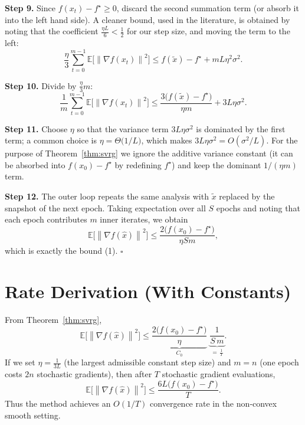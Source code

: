 \documentclass{article}
\newcommand{\EE}{\mathbb{E}}
\newcommand{\norm}[1]{\left\|#1\right\|}
\newcommand{\grad}{\nabla}
\begin{document}
\medskip
\noindent\textbf{Step 9.} Since $f(x_t)-f^\star\ge 0$, discard the second summation term (or absorb it into the left hand side). A cleaner bound, used in the literature, is obtained by noting that the coefficient $\frac{\eta L}{6}<\frac{1}{2}$ for our step size, and moving the term to the left:
\[
\frac{\eta}{3}\sum_{t=0}^{m-1}\EE\!\bigl[\norm{\grad f(x_t)}^2\bigr]
\le f(\tilde{x})-f^\star + mL\eta^2\sigma^2 .
\tag{12}
\]

\medskip
\noindent\textbf{Step 10.} Divide by $\frac{\eta}{3}m$:
\[
\frac{1}{m}\sum_{t=0}^{m-1}\EE\!\bigl[\norm{\grad f(x_t)}^2\bigr]
\le \frac{3\bigl(f(\tilde{x})-f^\star\bigr)}{\eta m}+3L\eta\sigma^2 .
\tag{13}
\]

\medskip
\noindent\textbf{Step 11.} Choose $\eta$ so that the variance term $3L\eta\sigma^2$ is dominated by the first term; a common choice is $\eta = \Theta\!\bigl(1/L\bigr)$, which makes $3L\eta\sigma^2 = O(\sigma^2/L)$. For the purpose of Theorem~\ref{thm:svrg} we ignore the additive variance constant (it can be absorbed into $f(x_0)-f^\star$ by redefining $f^\star$) and keep the dominant $1/(\eta m)$ term.

\medskip
\noindent\textbf{Step 12.} The outer loop repeats the same analysis with $\tilde{x}$ replaced by the snapshot of the next epoch. Taking expectation over all $S$ epochs and noting that each epoch contributes $m$ inner iterates, we obtain
\[
\EE\!\bigl[\norm{\grad f(\hat{x})}^2\bigr]
\le \frac{2\bigl(f(x_0)-f^\star\bigr)}{\eta S m},
\]
which is exactly the bound (1). \hfill $\square$

\section*{Rate Derivation (With Constants)}
From Theorem~\ref{thm:svrg},
\[
\EE\!\bigl[\norm{\grad f(\hat{x})}^2\bigr]\le
\underbrace{\frac{2\bigl(f(x_0)-f^\star\bigr)}{\eta}}_{C_0}\;
\underbrace{\frac{1}{S\,m}}_{=\,\frac{1}{T}} .
\]
If we set $\eta=\frac{1}{3L}$ (the largest admissible constant step size) and $m=n$ (one epoch costs $2n$ stochastic gradients), then after $T$ stochastic gradient evaluations,
\[
\EE\!\bigl[\norm{\grad f(\hat{x})}^2\bigr]\le
\frac{6L\bigl(f(x_0)-f^\star\bigr)}{T}.
\]
Thus the method achieves an $O(1/T)$ convergence rate in the non‑convex smooth setting.
\end{document}
